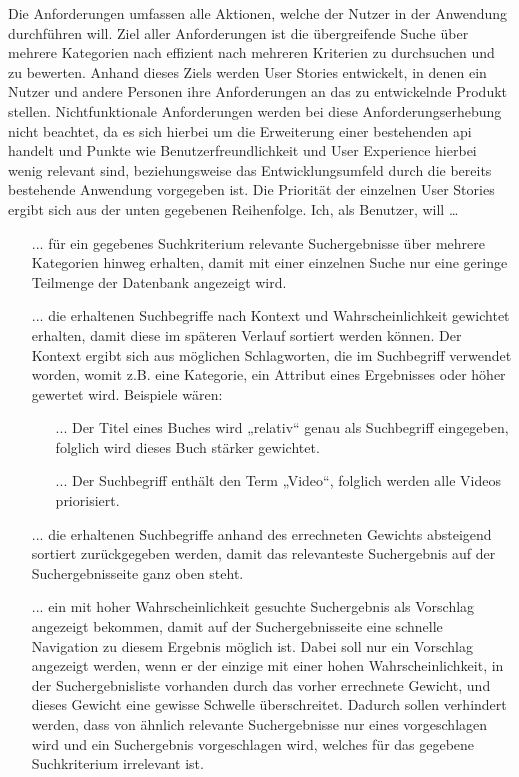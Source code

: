 Die Anforderungen umfassen alle Aktionen, welche der Nutzer in der Anwendung durchführen will. Ziel aller Anforderungen ist die übergreifende Suche über mehrere Kategorien nach effizient nach mehreren Kriterien zu durchsuchen und zu bewerten. Anhand dieses Ziels werden User Stories entwickelt, in denen ein Nutzer und andere Personen ihre Anforderungen an das zu entwickelnde Produkt stellen.
Nichtfunktionale Anforderungen werden bei diese Anforderungserhebung nicht beachtet, da es sich hierbei um die Erweiterung einer bestehenden \gls{api} handelt und Punkte wie Benutzerfreundlichkeit und User Experience hierbei wenig relevant sind, beziehungsweise das Entwicklungsumfeld durch die bereits bestehende Anwendung vorgegeben ist.
Die Priorität der einzelnen User Stories ergibt sich aus der unten gegebenen Reihenfolge.
Ich, als Benutzer, will …
\begin{itemize}
  \item[...] für ein gegebenes Suchkriterium relevante Suchergebnisse über mehrere Kategorien hinweg erhalten, damit mit einer einzelnen Suche nur eine geringe Teilmenge der Datenbank angezeigt wird.
  \item[...] die erhaltenen Suchbegriffe nach Kontext und Wahrscheinlichkeit gewichtet erhalten, damit diese im späteren Verlauf sortiert werden können. Der Kontext ergibt sich aus möglichen Schlagworten, die im Suchbegriff verwendet worden, womit z.B. eine Kategorie, ein Attribut eines Ergebnisses oder höher gewertet wird. Beispiele wären:
    \begin{itemize}
      \item[...] Der Titel eines Buches wird „relativ“ genau als Suchbegriff eingegeben, folglich wird dieses Buch stärker gewichtet.
      \item[...] Der Suchbegriff enthält den Term „Video“, folglich werden alle Videos priorisiert.
    \end{itemize}
  \item[...] die erhaltenen Suchbegriffe anhand des errechneten Gewichts absteigend sortiert zurückgegeben werden, damit das relevanteste Suchergebnis auf der Suchergebnisseite ganz oben steht.
  \item[...] ein mit hoher Wahrscheinlichkeit gesuchte Suchergebnis als Vorschlag angezeigt bekommen, damit auf der Suchergebnisseite eine schnelle Navigation zu diesem Ergebnis möglich ist. Dabei soll nur ein Vorschlag angezeigt werden, wenn er der einzige mit einer hohen Wahrscheinlichkeit, in der Suchergebnisliste vorhanden durch das vorher errechnete Gewicht, und dieses Gewicht eine gewisse Schwelle überschreitet. Dadurch sollen verhindert werden, dass von ähnlich relevante Suchergebnisse nur eines vorgeschlagen wird und ein Suchergebnis vorgeschlagen wird, welches für das gegebene Suchkriterium irrelevant ist.
\end{itemize}

